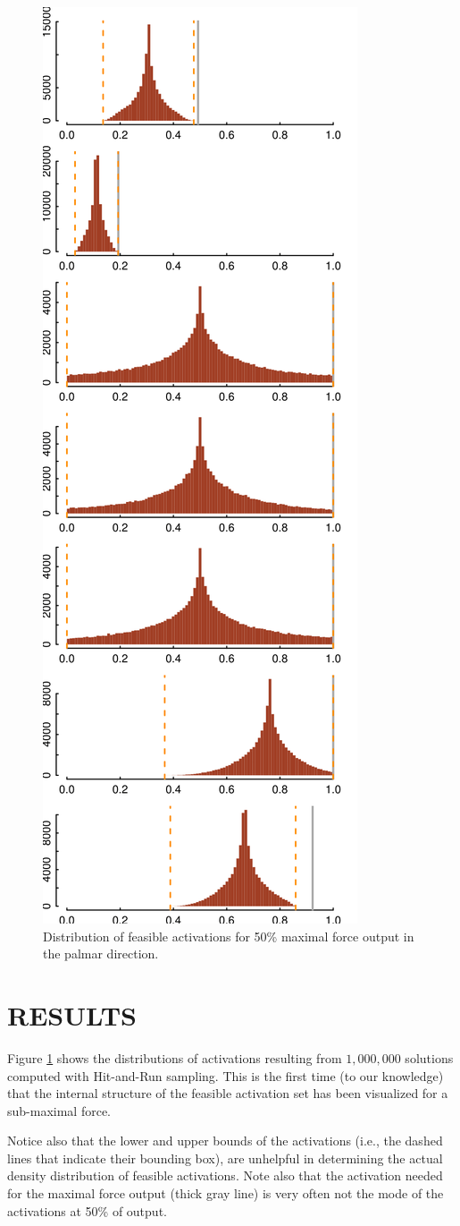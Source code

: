 \begin{figure}[htbp]
\centering
\includegraphics[width=7.5cmh]{sections/figs/raw_histograms.png}
\caption{Distribution of feasible activations for 50\% maximal force output in the palmar direction.}
\label{fig:raw_histograms}
\end{figure}


\section{RESULTS}

Figure \ref{fig:raw_histograms} shows the distributions of activations resulting from $1,000,000$ solutions computed with Hit-and-Run sampling. This is the first time (to our knowledge) that the internal structure of the feasible activation set has been visualized for a sub-maximal force.

Notice also that the lower and upper bounds of the activations (i.e., the dashed lines that indicate their bounding box), are unhelpful in determining the actual density distribution of feasible activations.
Note also that the activation needed for the maximal force output (thick gray line) is very often not the mode of the activations at 50\% of output.

